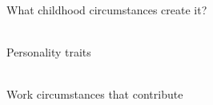 \documentclass[aspectratio=169]{beamer}
\begin{document}
\begin{frame}
  \begin{center}
    \Huge What childhood circumstances create it?
    \\ \small \cite{sakulku11}
    \\ \small \cite{langford93}
  \end{center}
\end{frame}

\begin{frame}
  \begin{center}
    \Huge Personality traits
    \\ \small \cite{hh15}
    \\ \small \cite{sakulku11}
  \end{center}
\end{frame}

\begin{frame}
  \begin{center}
    \Huge Work circumstances that contribute
    \\ \small \cite{hh15}
    \\ \small \cite{clark14}
  \end{center}
\end{frame}
\end{document}

